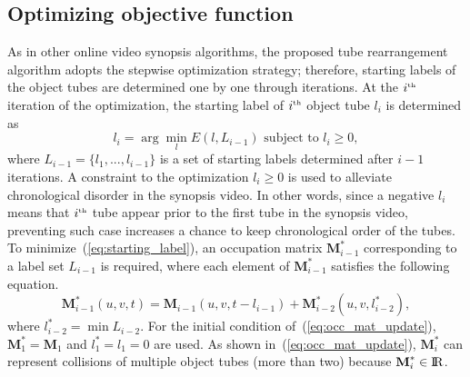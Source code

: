 \documentclass[11pt]{hyu_thesis}
\begin{document}
\subsection{Optimizing objective function}
As in other online video synopsis algorithms, the proposed tube rearrangement algorithm adopts the stepwise optimization strategy; therefore, starting labels of the object tubes are determined one by one through iterations. At the $i^\textrm{\tiny{th}}$ iteration of the optimization, the starting label of $i^\textrm{\tiny{th}}$ object tube $l_i$ is determined as
\begin{equation}
\label{eq:starting_label}
l_i = \arg\min_l E(l, L_{i-1}) \textrm{ subject to } l_i \geq 0,
\end{equation}
where $L_{i-1} = \{ {l}_{1},...,{l}_{i-1} \}$ is a set of starting labels determined after $i-1$ iterations. A constraint to the optimization ${l}_{i} \geq 0$ is used to alleviate chronological disorder in the synopsis video. In other words, since a negative $l_i$ means that ${i}^\textrm{\tiny{th}}$ tube appear prior to the first tube in the synopsis video, preventing such case increases a chance to keep chronological order of the tubes. To minimize~(\ref{eq:starting_label}), an occupation matrix $\textbf{M}_{i-1}^{*}$ corresponding to a label set $L_{i-1}$ is required, where each element of $\textbf{M}_{i-1}^{*}$  satisfies the following equation.
\begin{equation}
\label{eq:occ_mat_update}
\textbf{M}_{i-1}^{*}(u, v, t) = \textbf{M}_{i-1}(u, v, t - l_{i-1}) + \textbf{M}_{i-2}^{*}(u, v, l_{i-2}^{*}),
\end{equation}
where $l_{i-2}^{*} = \min L_{i-2}$. For the initial condition of~(\ref{eq:occ_mat_update}), $\textbf{M}_{1}^{*} = \textbf{M}_{1}$ and $l_{1}^{*} = l_{1} = 0$ are used. As shown in~(\ref{eq:occ_mat_update}), $\textbf{M}_{i}^{*}$ can represent collisions of multiple object tubes (more than two) because $\textbf{M}_{i}^{*} \in \rm I\!R$. 
\end{document}
